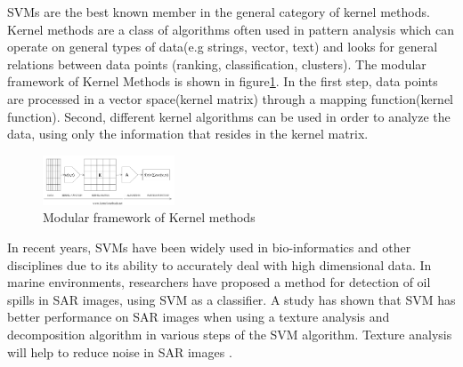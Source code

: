 SVMs are the best known member in the general category of kernel methods. Kernel methods are a class of algorithms often used in pattern analysis which can operate on general types of data(e.g strings, vector, text) and looks for general relations between data points (ranking, classification, clusters). The modular framework of Kernel Methods is shown in figure\ref{fig:Kernel}. In the first step, data points are processed in a vector space(kernel matrix) through a mapping function(kernel function). Second, different kernel algorithms can be used in order to analyze the data, using only the information that resides in the kernel matrix. \cite{shawe2004kernel}\\


\begin{figure}[H]
	\centering
    \includegraphics[width=0.35\textwidth]{./img/kernel1.png}
     \caption{\footnotesize{Modular framework of Kernel methods }}
    \label{fig:Kernel}
\end{figure} 



In recent years, SVMs have been widely used in bio-informatics \cite{furey2000support,osuna1997training,guyon2002gene} and other disciplines due to its ability to accurately deal with high dimensional data\cite{joachims1998text}. In marine environments, researchers have proposed a method for detection of oil spills in SAR images, using SVM as a classifier. A study has shown that SVM has better performance on SAR images when using a texture analysis and decomposition algorithm in various steps of the SVM algorithm. Texture analysis will help to reduce noise in SAR images \cite{matkan2013oil}.

